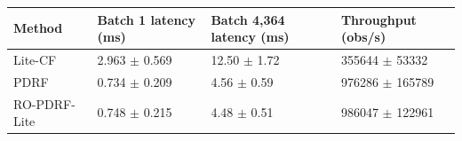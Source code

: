 \begin{tabular}{llll}
\toprule
Method & Batch 1 latency (ms) & Batch 4,364 latency (ms) & Throughput (obs/s) \\
\midrule
Lite-CF & 2.963 $\pm$ 0.569 & 12.50 $\pm$ 1.72 & 355644 $\pm$ 53332 \\
PDRF & 0.734 $\pm$ 0.209 & 4.56 $\pm$ 0.59 & 976286 $\pm$ 165789 \\
RO-PDRF-Lite & 0.748 $\pm$ 0.215 & 4.48 $\pm$ 0.51 & 986047 $\pm$ 122961 \\
\bottomrule
\end{tabular}
